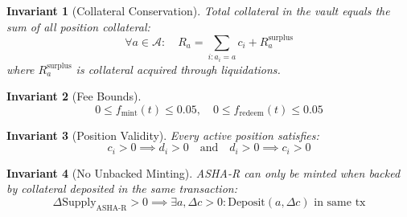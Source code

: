 \documentclass[11pt,a4paper]{article}
\newcommand{\ashares}{\textsc{ASHA-R}\xspace}
\newtheorem{invariant}{Invariant}
\begin{document}
\begin{invariant}[Collateral Conservation]
Total collateral in the vault equals the sum of all position collateral:
\begin{equation}
  \forall a \in \mathcal{A}: \quad R_a = \sum_{i: a_i = a} c_i + R_a^{\text{surplus}}
\end{equation}
where $R_a^{\text{surplus}}$ is collateral acquired through liquidations.
\end{invariant}

\begin{invariant}[Fee Bounds]
\begin{equation}
  0 \leq f_{\text{mint}}(t) \leq 0.05, \quad 0 \leq f_{\text{redeem}}(t) \leq 0.05
\end{equation}
\end{invariant}

\begin{invariant}[Position Validity]
Every active position satisfies:
\begin{equation}
  c_i > 0 \implies d_i > 0 \quad \text{and} \quad d_i > 0 \implies c_i > 0
\end{equation}
\end{invariant}

\begin{invariant}[No Unbacked Minting]
\ashares can only be minted when backed by collateral deposited in the same transaction:
\begin{equation}
  \Delta \text{Supply}_{\text{ASHA-R}} > 0 \implies \exists a, \Delta c > 0: \text{Deposit}(a, \Delta c) \text{ in same tx}
\end{equation}
\end{invariant}
\end{document}
